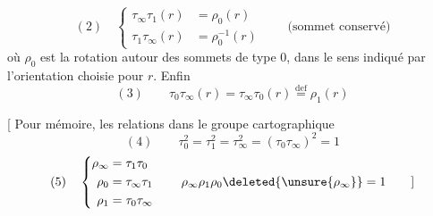 \[
 (2)\quad
 \left\{\begin{aligned}
 \tau_\infty\tau_1(r)&=\rho_0(r)\\
 \tau_1\tau_\infty(r)&=\rho_0^{-1}(r)
 \end{aligned}\right.
 \qquad\text{(sommet conservé)}
\]
où $\rho_0$ est la rotation  autour des sommets de type $0$, dans le sens indiqué par l'orientation choisie pour $r$. Enfin
\[
 (3)\qquad\tau_0\tau_\infty(r)=\tau_\infty\tau_0(r)\overset{\mathrm{def}}=\rho_1(r)
\]

[ Pour mémoire, les relations dans le groupe cartographique
\[
 (4)\qquad\tau_0^2=\tau_1^2=\tau_\infty^2=(\tau_0\tau_\infty)^2=1
\]
\[
 (5)\quad
 \left\{\begin{aligned}
 \rho_\infty&=\tau_1\tau_0\\
 \rho_0&=\tau_\infty\tau_1\\
 \rho_1&=\tau_0\tau_\infty
 \end{aligned}\right.
 \qquad\rho_\infty\rho_1\rho_0\deleted{\unsure{\rho_\infty}}=1
 \qquad\text{]}
\]
